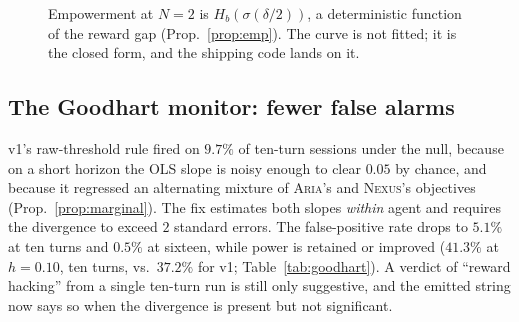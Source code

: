 \documentclass[11pt]{article}
\newcommand{\ARIA}{\textsc{Aria}}
\newcommand{\NEXUS}{\textsc{Nexus}}
\theoremstyle{plain}
\theoremstyle{definition}
\begin{document}
\begin{figure}[t]
\centering
{}
\caption{Empowerment at $N{=}2$ is $H_b(\sigma(\delta/2))$, a deterministic
function of the reward gap (Prop.~\ref{prop:emp}). The curve is not fitted; it is
the closed form, and the shipping code lands on it.}
\label{fig:emp}
\end{figure}

\subsection{The Goodhart monitor: fewer false alarms}
\label{sec:goodhart}
v1's raw-threshold rule fired on $9.7\%$ of ten-turn sessions under the null,
because on a short horizon the OLS slope is noisy enough to clear $0.05$ by
chance, and because it regressed an alternating mixture of \ARIA{}'s and
\NEXUS{}'s objectives (Prop.~\ref{prop:marginal}). The fix estimates both slopes
\emph{within} agent and requires the divergence to exceed $2$ standard errors.
The false-positive rate drops to $5.1\%$ at ten turns and $0.5\%$ at sixteen,
while power is retained or improved ($41.3\%$ at $h{=}0.10$, ten turns, vs.\
$37.2\%$ for v1; Table~\ref{tab:goodhart}). A verdict of ``reward hacking'' from
a single ten-turn run is still only suggestive, and the emitted string now says
so when the divergence is present but not significant.
\end{document}

